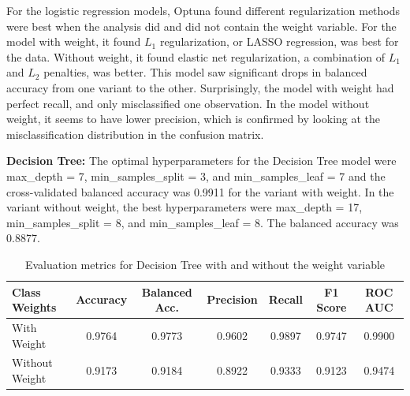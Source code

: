 \documentclass[a4paper,12pt]{article}
\begin{document}
For the logistic regression models, Optuna found different regularization methods were best when the analysis did and did not contain the weight variable. For the model with weight, it found $L_1$ regularization, or LASSO regression, was best for the data. Without weight, it found elastic net regularization, a combination of $L_1$ and $L_2$ penalties, was better. This model saw significant drops in balanced accuracy from one variant to the other. Surprisingly, the model with weight had perfect recall, and only misclassified one observation. In the model without weight, it seems to have lower precision, which is confirmed by looking at the misclassification distribution in the confusion matrix. 

\textbf{Decision Tree:}
The optimal hyperparameters for the Decision Tree model were max\_depth = 7, min\_samples\_split = 3, and min\_samples\_leaf = 7 and the cross-validated balanced accuracy was 0.9911 for the variant with weight. In the variant without weight, the best hyperparameters were max\_depth = 17, min\_samples\_split = 8, and min\_samples\_leaf = 8. The balanced accuracy was 0.8877.

\begin{table}[H]
\centering
\small
\begin{tabular}{lcccccc}
\toprule
\textbf{Class Weights} & \textbf{Accuracy} & \textbf{Balanced Acc.} & \textbf{Precision} & \textbf{Recall} & \textbf{F1 Score} & \textbf{ROC AUC} \\
\midrule
With Weight & 0.9764 & 0.9773 & 0.9602 & 0.9897 & 0.9747 & 0.9900 \\
Without Weight & 0.9173 & 0.9184 & 0.8922 & 0.9333 & 0.9123 & 0.9474 \\
\bottomrule
\end{tabular}
\caption{Evaluation metrics for Decision Tree with and without the weight variable}
\label{tab:dtree_weights}
\end{table}
\end{document}
